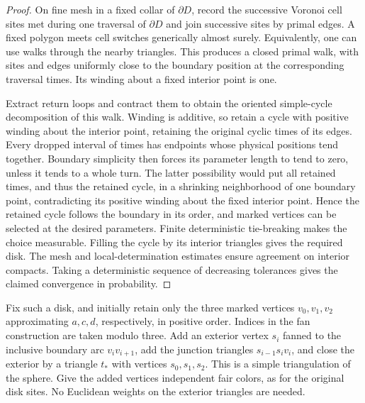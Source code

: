 \begin{proof}
On fine mesh in a fixed collar of $\partial D$, record the successive
Voronoi cell sites met during one traversal of $\partial D$ and join
successive sites by primal edges. A fixed polygon meets cell switches
generically almost surely. Equivalently, one can use walks through the
nearby triangles. This produces a closed primal walk, with sites and
edges uniformly close to the boundary position at the corresponding
traversal times. Its winding about a fixed interior point is one.

Extract return loops and contract them to obtain the oriented
simple-cycle decomposition of this walk. Winding is additive, so retain
a cycle with positive winding about the interior point, retaining the
original cyclic times of its edges. Every dropped interval of times has
endpoints whose physical positions tend together. Boundary simplicity
then forces its parameter length to tend to zero, unless it tends to a
whole turn. The latter possibility would put all retained times, and
thus the retained cycle, in a shrinking neighborhood of one boundary
point, contradicting its positive winding about the fixed interior
point. Hence the retained cycle follows the boundary in its order, and
marked vertices can be selected at the desired parameters. Finite
deterministic tie-breaking makes the choice measurable. Filling the
cycle by its interior triangles gives the required disk. The mesh and
local-determination estimates ensure agreement on interior compacts.
Taking a deterministic sequence of decreasing tolerances gives the
claimed convergence in probability.
\end{proof}

Fix such a disk, and initially retain only the three marked vertices
$v_0,v_1,v_2$ approximating $a,c,d$, respectively, in positive order.
Indices in the fan construction are taken modulo three. Add an exterior
vertex $s_i$ fanned to the inclusive boundary arc $v_i v_{i+1}$, add the
junction triangles $s_{i-1}s_i v_i$, and close the exterior by a triangle
$t_*$ with vertices $s_0,s_1,s_2$. This is a simple triangulation of the
sphere. Give the added vertices independent fair colors, as for the
original disk sites. No Euclidean weights on the exterior triangles are
needed.

